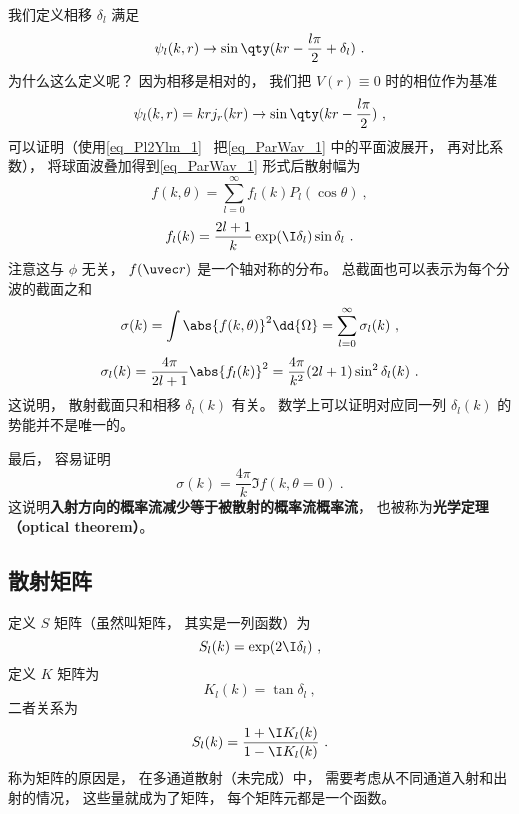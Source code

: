 我们定义相移 $\delta_l$ 满足
\begin{equation}
\psi_l(k, r) \to \sin\qty(kr - \frac{l\pi}{2} + \delta_l)~.
\end{equation}
为什么这么定义呢？ 因为相移是相对的， 我们把 $V(r) \equiv 0$ 时的相位作为基准
\begin{equation}
\psi_l(k, r) = kr j_r(kr) \to \sin\qty(kr - \frac{l\pi}{2})~,
\end{equation}
可以证明（使用\autoref{eq_Pl2Ylm_1}~ 把\autoref{eq_ParWav_1} 中的平面波展开， 再对比系数）， 将球面波叠加得到\autoref{eq_ParWav_1} 形式后散射幅为
\begin{equation}
f(k, \theta) = \sum_{l=0}^\infty f_l(k) P_l(\cos\theta)~,
\end{equation}
\begin{equation}
f_l(k) = \frac{2l+1}{k} \exp(\I\delta_l) \sin\delta_l~.
\end{equation}
注意这与 $\phi$ 无关， $f(\uvec r)$ 是一个轴对称的分布。 总截面也可以表示为每个分波的截面之和
\begin{equation}
\sigma(k) = \int \abs{f(k,\theta)}^2 \dd{\Omega} = \sum_{l=0}^\infty \sigma_l(k)~,
\end{equation}
\begin{equation}
\sigma_l(k) = \frac{4\pi}{2l+1} \abs{f_l(k)}^2 = \frac{4\pi}{k^2} (2l + 1) \sin^2 \delta_l(k)~.
\end{equation}
这说明， 散射截面只和相移 $\delta_l(k)$ 有关。 数学上可以证明对应同一列 $\delta_l(k)$ 的势能并不是唯一的。

最后， 容易证明
\begin{equation}
\sigma(k) = \frac{4\pi}{k} \Im f(k,\theta=0)~.
\end{equation}
这说明\textbf{入射方向的概率流减少等于被散射的概率流概率流}， 也被称为\textbf{光学定理（optical theorem）}。

\subsection{散射矩阵}
定义 $S$ 矩阵（虽然叫矩阵， 其实是一列函数）为
\begin{equation}
S_l(k) = \exp(2\I\delta_l)~,
\end{equation}
定义 $K$ 矩阵为
\begin{equation}
K_l(k) = \tan \delta_l~,
\end{equation}
二者关系为
\begin{equation}
S_l(k) = \frac{1 + \I K_l(k)}{1 - \I K_l(k)}~.
\end{equation}
称为矩阵的原因是， 在多通道散射（未完成）中， 需要考虑从不同通道入射和出射的情况， 这些量就成为了矩阵， 每个矩阵元都是一个函数。


